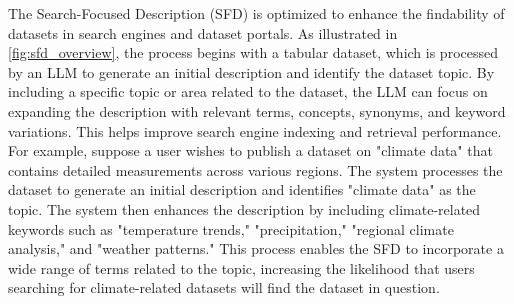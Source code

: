 The Search-Focused Description (SFD) is optimized to enhance the findability of datasets in search engines and dataset portals. As illustrated in \autoref{fig:sfd_overview}, the process begins with a tabular dataset, which is processed by an LLM to generate an initial description and identify the dataset topic. 
% 
By including a specific topic or area related to the dataset, the LLM can focus on expanding the description with relevant terms, concepts, synonyms, and keyword variations. This helps improve search engine indexing and retrieval performance.
% 
For example, suppose a user wishes to publish a dataset on "climate data" that contains detailed measurements across various regions. The system processes the dataset to generate an initial description and identifies "climate data" as the topic. 
% 
% 
The system then enhances the description by including climate-related keywords such as "temperature trends," "precipitation," "regional climate analysis," and "weather patterns." This process enables the SFD to incorporate a wide range of terms related to the topic, increasing the likelihood that users searching for climate-related datasets will find the dataset in question.



